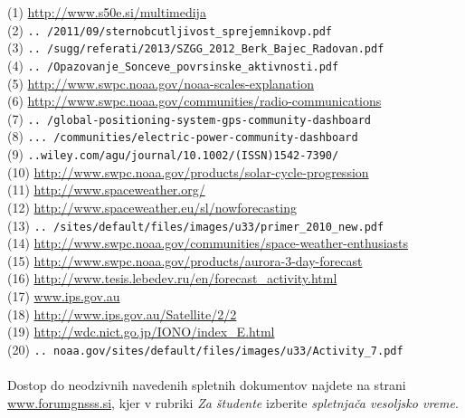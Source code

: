 (1)   \url{http://www.s50e.si/multimedija}\\[2mm]
(2)   \verb|.. /2011/09/sternobcutljivost_sprejemnikovp.pdf| \\
(3)   \verb|.. /sugg/referati/2013/SZGG_2012_Berk_Bajec_Radovan.pdf| \\
(4)   \verb|.. /Opazovanje_Sonceve_povrsinske_aktivnosti.pdf| \\
(5)   \url{http://www.swpc.noaa.gov/noaa-scales-explanation}\\[2mm]   
(6)   \url{http://www.swpc.noaa.gov/communities/radio-communications}\\[2mm]   
(7)   \verb|.. /global-positioning-system-gps-community-dashboard| \\   
(8)   \verb|... /communities/electric-power-community-dashboard|  \\ 
(9)   \verb|..wiley.com/agu/journal/10.1002/(ISSN)1542-7390/ |  \\   
(10)  \url{http://www.swpc.noaa.gov/products/solar-cycle-progression}\\[2mm]   
(11)  \url{http://www.spaceweather.org/}\\[2mm]   
(12)  \url{http://www.spaceweather.eu/sl/nowforecasting}\\[2mm]   
(13)  \verb|.. /sites/default/files/images/u33/primer_2010_new.pdf|  \\   
(14)  \url{http://www.swpc.noaa.gov/communities/space-weather-enthusiasts}\\[2mm]  
(15)  \url{http://www.swpc.noaa.gov/products/aurora-3-day-forecast}\\[2mm]   
(16)  \url{http://www.tesis.lebedev.ru/en/forecast_activity.html}\\[2mm]   
(17)  \url{www.ips.gov.au}\\[2mm]   
(18)  \url{http://www.ips.gov.au/Satellite/2/2}\\[2mm]   
(19)  \url{http://wdc.nict.go.jp/IONO/index_E.html}\\[2mm]   
(20)  \verb|.. noaa.gov/sites/default/files/images/u33/Activity_7.pdf|

\paragraph*{ }
Dostop do neodzivnih navedenih spletnih dokumentov najdete na strani \url{www.forumgnsss.si}, kjer v rubriki \textit{Za študente} izberite \textit{spletnjača vesoljsko vreme}.


%
%
